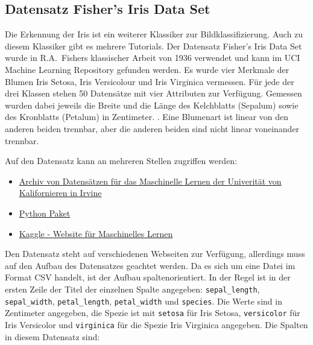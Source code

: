 %
%



\subsection{Datensatz Fisher's Iris Data Set}

Die Erkennung der Iris ist ein weiterer Klassiker zur Bildklassifizierung. Auch zu diesem Klassiker gibt es mehrere Tutorials. Der Datensatz Fisher's Iris Data Set wurde in R.A.~Fishers klassischer Arbeit von 1936 verwendet und kann im UCI Machine Learning Repository  gefunden werden. \cite{Fisher:1936,Iris:2021,Schutten:2016} Es wurde vier Merkmale der Blumen Iris Setosa, Iris Versicolour und Iris Virginica vermessen. Für jede der drei Klassen stehen 50 Datensätze mit vier Attributen zur Verfügung. Gemessen wurden dabei jeweils die Breite und die Länge des Kelchblatts (Sepalum) sowie des Kronblatts (Petalum) in Zentimeter. \cite{Anderson:1935,Sahni:2006}. Eine Blumenart ist linear von den anderen beiden trennbar, aber die anderen beiden sind nicht linear voneinander trennbar.


Auf den Datensatz kann an mehreren Stellen zugriffen werden:

\begin{itemize}
    \item \href{https://archive.ics.uci.edu/ml/datasets/iris}{Archiv von Datensätzen für das Maschinelle Lernen der Univerität von Kalifornieren in Irvine} \cite{UCIIris:2021}
    \item \href{https://scikit-learn.org/stable/auto_examples/datasets/plot_iris_dataset.html}{Python Paket } \cite{scikit-learn:2011}
    \item \href{https://www.kaggle.com/uciml/iris}{Kaggle - Website für Maschinelles Lernen} \cite{KaggleIris:2018}
\end{itemize}

Den Datensatz steht auf verschiedenen Webseiten zur Verfügung, allerdings muss auf den Aufbau des Datensatzes geachtet werden. Da es sich um eine Datei im Format CSV handelt, ist der Aufbau spaltenorientiert. In der Regel ist in der ersten Zeile der Titel der einzelnen Spalte angegeben: \texttt{sepal\_length}, \texttt{sepal\_width}, \texttt{petal\_length}, \texttt{petal\_width} und \texttt{species}. Die Werte sind in Zentimeter angegeben, die Spezie ist mit \texttt{setosa} für Iris Setosa, \texttt{versicolor} für Iris Versicolor und \texttt{virginica} für die Spezie Iris Virginica angegeben.
Die Spalten in diesem Datensatz sind:


